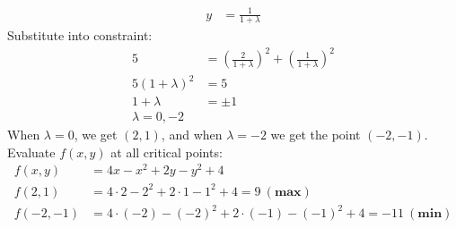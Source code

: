 {\begin{align*}
        y&=\frac{1}{1+\lambda}
    \end{align*}
    Substitute into constraint: 
    \begin{align*}
        5 &=\left(\frac{2}{1+\lambda}\right)^2 + \left(\frac{1}{1+\lambda}\right)^2 \\
        5(1+\lambda)^2 &= 5 \\
        1 + \lambda &= \pm 1 \\
        \lambda = 0, -2
    \end{align*}
    When $\lambda = 0$, we get $(2,1)$, and when $\lambda = -2$ we get the point $(-2,-1)$. 
    Evaluate $f(x,y)$ at all critical points:
    \begin{align*}
        f(x,y) &= 4x - x^2 + 2y - y^2  + 4\\
        f(2,1) &= 4\cdot 2 - 2^2 + 2\cdot1 - 1^2+4 = 9 \ (\textbf{max})\\
        f(-2,-1) &= 4\cdot (-2) - (-2)^2 + 2\cdot(-1) - (-1)^2+4 = -11 \ (\textbf{min})
    \end{align*}
    } 
   \else
   \fi

\fi 







